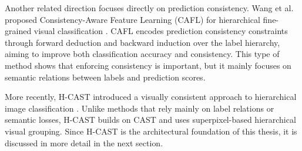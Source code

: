 Another related direction focuses directly on prediction consistency. Wang et al. proposed Consistency-Aware Feature Learning (CAFL) for hierarchical fine-grained visual classification \cite{wang2023consistency}. CAFL encodes prediction consistency constraints through forward deduction and backward induction over the label hierarchy, aiming to improve both classification accuracy and consistency. This type of method shows that enforcing consistency is important, but it mainly focuses on semantic relations between labels and prediction scores.

More recently, H-CAST introduced a visually consistent approach to hierarchical image classification \cite{park2025visually}. Unlike methods that rely mainly on label relations or semantic losses, H-CAST builds on CAST \cite{ke2024learning} and uses superpixel-based hierarchical visual grouping. Since H-CAST is the architectural foundation of this thesis, it is discussed in more detail in the next section.